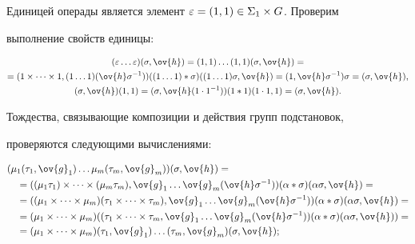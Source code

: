 \begin{pf}


Единицей операды является элемент $\varepsilon=(1,1) \in \Sigma_1 \times G$. Проверим


выполнение свойств единицы:


\begin{gather*}


(\ep \dotsc \e)(\s,\ov{h})=(1,1) \dotsc (1,1)(\s,\ov{h})=\\


=(1 \times \dotsb \times 1,(1 \dotsc 1)(\ov{h}\s^{-1}))


((1 \dotsc 1) * \s) ((1 \dotsc 1)\s,\ov{h})=


(1,\ov{h}\s^{-1})\s=(\s,\ov{h}), \\


(\s,\ov{h})(1,1)=(\s,\ov{h}(1 \cdot 1^{-1}))(1 * 1)(1 \cdot 1,1)= (\s,\ov{h}).


\end{gather*}


Тождества, связывающие композиции и действия групп подстановок,


проверяются следующими вычислениями:


\begin{align*}


&(\mu_1(\t_1,\ov{g}_1) \dotsc \mu_{m}(\t_m,\ov{g}_m))(\s,\ov{h})=\\


&\quad=((\mu_1\t_1) \times \dotsb \times (\mu_{m}\t_{m}), 


\ov{g}_{1} \dotsc \ov{g}_{m} (\ov{h} \s^{-1}) )(\al * \s)(\al\s,\ov{h})=\\


&\quad=(( \mu_1 \times \dotsb \times \mu_{m})( \t_1 \times \dotsb \times \t_{m}), 


\ov{g}_{1} \dotsc \ov{g}_{m} (\ov{h} \s^{-1}) ) (\al * \s)(\al\s,\ov{h})=\\


&\quad=( \mu_1 \times \dotsb \times \mu_{m})


(( \t_1 \times \dotsb \times \t_{m}, 


\ov{g}_{1} \dotsc \ov{g}_{m} (\ov{h} \s^{-1}) )


(\al * \s)(\al\s,\ov{h}))= \\


&\quad=( \mu_1 \times \dotsb \times \mu_{m})


(\t_1,\ov{g}_1) \dotsc (\t_m,\ov{g}_m)(\s,\ov{h}); \\



\end{align*}
\end{pf}
